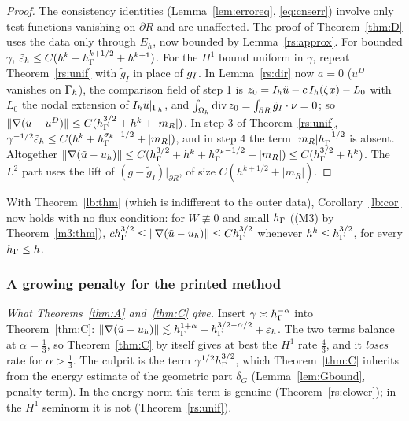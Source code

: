 \begin{proof}
The consistency identities (Lemma~\ref{lem:erroreq}, \eqref{eq:cnserr}) involve only test functions vanishing on $\partial R$ and are unaffected. The proof of Theorem~\ref{thm:D} uses the data only through $E_h$, now bounded by Lemma~\ref{rs:approx}. For bounded $\gamma$, $\tilde\varepsilon_h\le C(h^k+h_\Gamma^{k+1/2}+h^{k+1})$. For the $H^1$ bound uniform in $\gamma$, repeat Theorem~\ref{rs:unif} with $\tilde g_I$ in place of $g_I$. In Lemma~\ref{rs:dir} now $a=0$ ($u^D$ vanishes on $\Gamma_h$), the comparison field of step 1 is $z_0=I_h\tilde u-c\,I_h(\zeta x)-L_0$ with $L_0$ the nodal extension of $I_h\tilde u|_{\Gamma_h}$, and $\int_{\Omega_h}\operatorname{div} z_0=\int_{\partial R}\tilde g_I\cdot\nu=0$; so $\lVert \nabla(\tilde u-u^D)\rVert\le C(h_\Gamma^{3/2}+h^k+|m_R|)$. In step 3 of Theorem~\ref{rs:unif}, $\gamma^{-1/2}\tilde\varepsilon_h\le C(h^k+h_\Gamma^{\sigma_k-1/2}+|m_R|)$, and in step 4 the term $|m_R|h_\Gamma^{-1/2}$ is absent. Altogether $\lVert \nabla(\tilde u-u_h)\rVert\le C(h_\Gamma^{3/2}+h^k+h_\Gamma^{\sigma_k-1/2}+|m_R|)\le C(h_\Gamma^{3/2}+h^k)$. The $L^2$ part uses the lift of $(g-\tilde g_I)|_{\partial R}$, of size $C(h^{k+1/2}+|m_R|)$.
\end{proof}

With Theorem~\ref{lb:thm} (which is indifferent to the outer data), Corollary~\ref{lb:cor} now holds with no flux condition: for $W\not\equiv0$ and small $h_\Gamma$ ((M3) by Theorem~\ref{m3:thm}), $ch_\Gamma^{3/2}\le\lVert \nabla(\tilde u-u_h)\rVert\le Ch_\Gamma^{3/2}$ whenever $h^k\le h_\Gamma^{3/2}$, for every $h_\Gamma\le h$.

\subsubsection{A growing penalty for the printed method}

\emph{What Theorems~\ref{thm:A} and~\ref{thm:C} give.} Insert $\gamma\asymp h_\Gamma^{-\alpha}$ into Theorem~\ref{thm:C}: $\lVert \nabla(\tilde u-u_h)\rVert\lesssim h_\Gamma^{1+\alpha}+h_\Gamma^{3/2-\alpha/2}+\varepsilon_h$. The two terms balance at $\alpha=\frac13$, so Theorem~\ref{thm:C} by itself gives at best the $H^1$ rate $\frac43$, and it \emph{loses} rate for $\alpha>\frac13$. The culprit is the term $\gamma^{1/2}h_\Gamma^{3/2}$, which Theorem~\ref{thm:C} inherits from the energy estimate of the geometric part $\delta_G$ (Lemma~\ref{lem:Gbound}, penalty term). In the energy norm this term is genuine (Theorem~\ref{rs:elower}); in the $H^1$ seminorm it is not (Theorem~\ref{rs:unif}).


